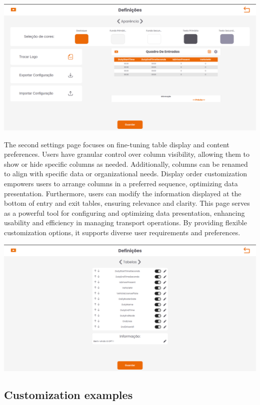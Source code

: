 \documentclass[10pt]{article}
\begin{document}
            \vfill
        \includegraphics[width=1\textwidth]{aparencia}
            \vfill

        The second settings page focuses on fine-tuning table display and content preferences. Users have granular control over column visibility, allowing them to show or hide specific columns as needed. Additionally, columns can be renamed to align with specific data or organizational needs.
        Display order customization empowers users to arrange columns in a preferred sequence, optimizing data presentation. Furthermore, users can modify the information displayed at the bottom of entry and exit tables, ensuring relevance and clarity.
        This page serves as a powerful tool for configuring and optimizing data presentation, enhancing usability and efficiency in managing transport operations. By providing flexible customization options, it supports diverse user requirements and preferences.
        

            \vfill
        \includegraphics[width=1\textwidth]{tabelas}
            \vfill

        \subsection{Customization examples}
\end{document}
